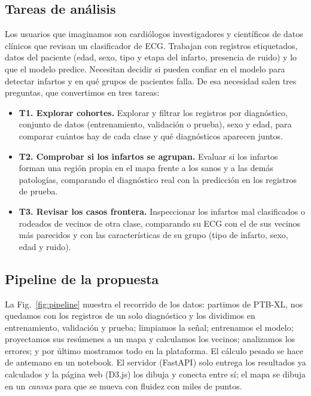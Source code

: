 \documentclass[conference]{IEEEtran}
\begin{document}
\subsection{Tareas de análisis}
Los usuarios que imaginamos son cardiólogos investigadores y científicos de datos clínicos que revisan un clasificador de ECG. Trabajan con registros etiquetados, datos del paciente (edad, sexo, tipo y etapa del infarto, presencia de ruido) y lo que el modelo predice. Necesitan decidir si pueden confiar en el modelo para detectar infartos y en qué grupos de pacientes falla. De esa necesidad salen tres preguntas, que convertimos en tres tareas:
\begin{itemize}
\item \textbf{T1. Explorar cohortes.} Explorar y filtrar los registros por diagnóstico, conjunto de datos (entrenamiento, validación o prueba), sexo y edad, para comparar cuántos hay de cada clase y qué diagnósticos aparecen juntos.
\item \textbf{T2. Comprobar si los infartos se agrupan.} Evaluar si los infartos forman una región propia en el mapa frente a los sanos y a las demás patologías, comparando el diagnóstico real con la predicción en los registros de prueba.
\item \textbf{T3. Revisar los casos frontera.} Inspeccionar los infartos mal clasificados o rodeados de vecinos de otra clase, comparando su ECG con el de sus vecinos más parecidos y con las características de su grupo (tipo de infarto, sexo, edad y ruido).
\end{itemize}

\subsection{Pipeline de la propuesta}
La Fig.~\ref{fig:pipeline} muestra el recorrido de los datos: partimos de PTB-XL, nos quedamos con los registros de un solo diagnóstico y los dividimos en entrenamiento, validación y prueba; limpiamos la señal; entrenamos el modelo; proyectamos sus resúmenes a un mapa y calculamos los vecinos; analizamos los errores; y por último mostramos todo en la plataforma. El cálculo pesado se hace de antemano en un notebook. El servidor (FastAPI) solo entrega los resultados ya calculados y la página web (D3.js) los dibuja y conecta entre sí; el mapa se dibuja en un \emph{canvas} para que se mueva con fluidez con miles de puntos.
\end{document}
